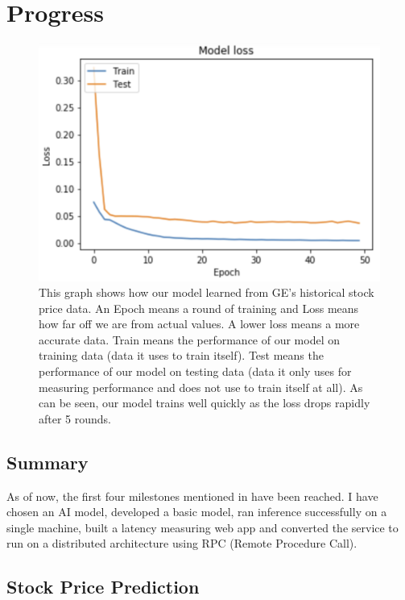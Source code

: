 \documentclass{report}
\begin{document}
\chapter{Progress}\label{chap:progress}

\begin{figure}
  \includegraphics[width=\textwidth]{EpochVModelLoss.png}
  \caption{This graph shows how our model learned from GE's historical stock price data. An Epoch means a round of training and Loss means how far off we are from actual values. A lower loss means a more accurate data. Train means the performance of our model on training data (data it uses to train itself). Test means the performance of our model on testing data (data it only uses for measuring performance and does not use to train itself at all). As can be seen, our model trains well quickly as the loss drops rapidly after 5 rounds.}
  \label{fig:EpochVModelLoss}
\end{figure}

\section{Summary}
As of now, the first four milestones mentioned in  have been reached.
I have chosen an AI model, developed a basic model, ran inference successfully on a single machine, built a latency measuring web app and converted the service to run on a distributed architecture using RPC (Remote Procedure Call).

\section{Stock Price Prediction}
\end{document}
